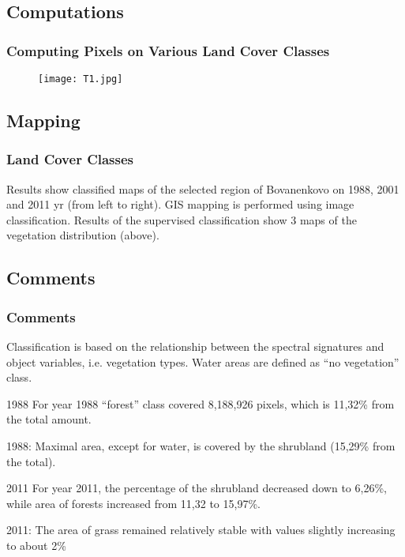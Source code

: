 \documentclass[pdflatex,compress,8pt,
	xcolor={dvipsnames,dvipsnames,svgnames,x11names,table},
	hyperref={colorlinks = true,breaklinks = true, urlcolor = NavyBlue, breaklinks = true}]{beamer}
\begin{document}
\subsection{Computations}
\begin{frame}\frametitle{Computing Pixels on Various Land Cover Classes}
\begin{figure}[H]
	\centering
		\texttt{[image: T1.jpg]}
\end{figure}
\end{frame}

\subsection{Mapping}
\begin{frame}\frametitle{Land Cover Classes}
\begin{figure}[H]
	\centering
\end{figure}
Results show classified maps of the selected region of Bovanenkovo on 1988, 2001 and 2011 yr (from left to right).
GIS mapping is performed using image classification. Results of the supervised classification show 3 maps of the vegetation distribution (above). 
\end{frame}

\subsection{Comments}
\begin{frame}\frametitle{Comments}
Classification is based on the relationship between the spectral signatures and object variables, i.e. vegetation types. Water areas are defined as “no vegetation” class.

\begin{block}{1988}
For year 1988 “forest” class covered 8,188,926 pixels, which is 11,32\% from the total amount.
\end{block}

\begin{examples}{1988:}
Maximal area, except for water, is covered by the shrubland (15,29\% from the total).
\end{examples}

\begin{block}{2011}
For year 2011, the percentage of the shrubland decreased down to 6,26\%, while area of forests increased from 11,32 to 15,97\%.
\end{block}

\begin{examples}{2011:}
The area of grass remained relatively stable with values slightly increasing to about 2\%
\end{examples}

\end{frame}
\end{document}
